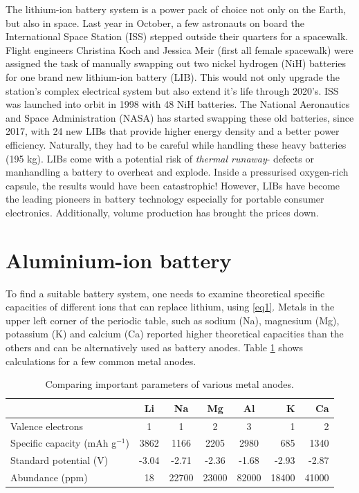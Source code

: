 {The lithium-ion battery system is a power pack of choice not only on the Earth, but also in space. Last year in October, a few astronauts on board the International Space Station (ISS) stepped outside their quarters for a spacewalk. Flight engineers Christina Koch and Jessica Meir (first all female spacewalk) were assigned the task of manually swapping out two nickel hydrogen (NiH) batteries for one brand new lithium-ion battery (LIB). This would not only upgrade the station's complex electrical system but also extend it's life through 2020's. ISS was launched into orbit in 1998 with 48 NiH batteries. The National Aeronautics and Space Administration (NASA) has started swapping these old batteries, since 2017, with 24 new LIBs  that provide higher energy density and a better power efficiency. Naturally, they had to be careful while handling these heavy batteries (195 kg). LIBs come with a potential risk of \textit{thermal runaway}- defects or manhandling a battery to overheat and explode. Inside a pressurised oxygen-rich capsule, the results would have been catastrophic! 
However, LIBs have become the leading pioneers in battery technology especially for portable consumer electronics. Additionally, volume production has brought the prices down.

\section{Aluminium-ion battery}
To find a suitable battery system, one needs to examine theoretical specific capacities of different ions that can replace lithium, using \ref{eq1}. Metals in the upper left corner of the periodic table, such as sodium (Na), magnesium (Mg), potassium (K) and calcium (Ca) reported higher theoretical capacities than the others and can be alternatively used as battery anodes. Table  \ref{table1} shows calculations for a few common metal anodes. 

\begin{table}[tbh!]
\caption{Comparing important parameters of various metal anodes.} \label{table1}
\begin{tabular}{lccccrr}
\headrow
\hline
 & \textbf{Li} & \textbf{Na} & \textbf{Mg} & \textbf{Al} & \textbf{K} & \textbf{Ca}\\
\hline
Valence electrons & 1 & 1 & 2 & 3 & 1 & 2\\
Specific capacity (mAh g$^{-1}$) & 3862 & 1166 & 2205 & 2980 & 685 & 1340\\
Standard potential (V) & -3.04 & -2.71 & -2.36  & -1.68 & -2.93 & -2.87\\
Abundance (ppm) & 18 & 22700 & 23000 & 82000 & 18400 & 41000\\
\hline  %
\end{tabular}
\end{table}

}
